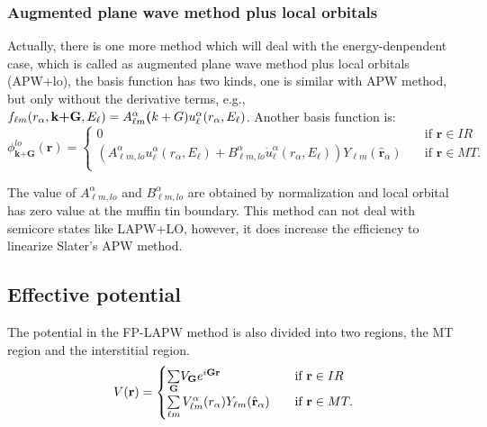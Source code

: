 \documentclass[a4paper, 12pt, titlepage,oneside,drop]{kthesis}
\begin{document}
\subsubsection{Augmented plane wave method plus local orbitals}

Actually, there is one more method which will deal with the energy-denpendent case, which is called as augmented plane wave method plus local orbitals (APW+lo), the 
basis function has two kinds, one is similar with APW method, but only without the derivative terms, e.g., $f_{{\ell}{m}} (r_{\alpha},\textbf{k+G} ,E_{\ell}) =  A _{{\ell}m}^{\alpha} \textbf(k+G) u_{{\ell}}^{\alpha}(r_{\alpha}, E_{\ell})$.
Another basis function is:
\begin{equation}\label{lap6}
\phi^{lo}_\textbf{k+G} (\textbf{r}) = 
\begin{cases} 0 & \quad \mbox{if $\textbf{r} \in IR $}
\\
(A _{{\ell}m,lo}^{\alpha}  u_{{\ell}}^{\alpha}(r_{\alpha}, E_{\ell}) + B _{{\ell}m,lo}^{\alpha}  \dot{u}_{{\ell}}^{\alpha}(r_{\alpha}, E_{\ell}) ){Y_{{\ell}m}(\hat{\textbf{r}}_{\alpha})} & \quad \mbox{if $\textbf{r} \in MT. $}\\ 
\end{cases}
\end{equation}
 
The value of $A _{{\ell}m,lo}^{\alpha}$ and $B _{{\ell}m,lo}^{\alpha}$ are obtained by normalization and local orbital has zero value at the muffin tin boundary. This method can not deal with semicore states like LAPW+LO, 
however, it does increase the efficiency to linearize Slater's APW method.

\subsection{Effective potential}

\label{epote}
The potential in the FP-LAPW method is also divided into two regions, the MT region and the interstitial region.
\begin{equation*}\label{lap7}
V(\textbf{r}) = 
\begin{cases} \sumg<{\textbf G}> V_{\textbf G} e^{i {\textbf G} {\textbf {r}  }} & \quad \mbox{if $\textbf{r} \in IR $}
\\
 \sum\limits_{{\ell}m} V_{{\ell}m}^{\alpha} (r_{\alpha}) Y_{{\ell}m}(\hat{{\textbf r}}_{\alpha})  & \quad \mbox{if $\textbf{r} \in MT. $}\\ 
\end{cases}
\end{equation*}
\end{document}
